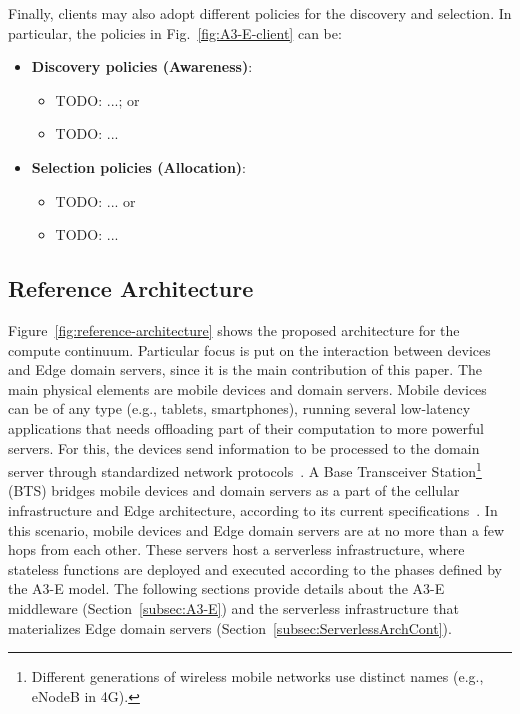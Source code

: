 Finally, clients may also adopt different policies for the discovery and selection. In particular, the policies in Fig.~\ref{fig:A3-E-client} can be:

\begin{itemize}

\item \textbf{Discovery policies (Awareness)}:

\begin{itemize}
	
	\item TODO: ...; or
	
	\item TODO: ...
	
\end{itemize}

\item \textbf{Selection policies (Allocation)}:

\begin{itemize}
	
	\item TODO: ... or
	
	\item TODO: ...
	
\end{itemize}
\end{itemize}


\subsection{Reference Architecture}

Figure~\ref{fig:reference-architecture} shows the proposed architecture for the compute continuum. Particular focus is put on the interaction between devices and Edge domain servers, since it is the main contribution of this paper. 
The main physical elements are mobile devices and domain servers. Mobile devices can be of any type (e.g., tablets, smartphones), running several low-latency applications that needs offloading part of their computation to more powerful servers. For this, the devices send information to be processed to the domain server through standardized network protocols~\cite{Sill17standards}.  A Base Transceiver Station\footnote{Different generations of wireless mobile networks use distinct names (e.g., eNodeB in 4G).} (BTS) bridges mobile devices and domain servers as a part of the cellular infrastructure and  Edge architecture, according to its current specifications~\cite{hu2015mobile}. In this scenario, mobile devices and Edge domain servers are at no more than a few hops from each other. These servers host a serverless infrastructure, where stateless functions are deployed and executed according to the phases defined by the A3-E model. 
The following sections provide details about the A3-E middleware (Section~\ref{subsec:A3-E}) and the serverless infrastructure that materializes Edge domain servers (Section~\ref{subsec:ServerlessArchCont}).

